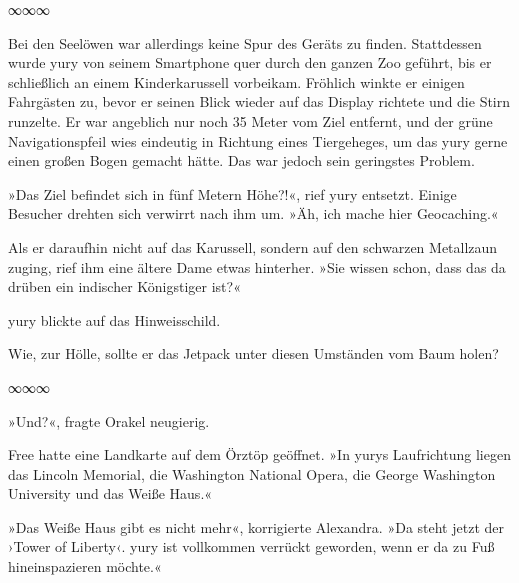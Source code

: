 \begin{center}
	∞∞∞
\end{center}

Bei den Seelöwen war allerdings keine Spur des Geräts zu finden. Stattdessen wurde yury von seinem Smartphone quer durch den ganzen Zoo geführt, bis er schließlich an einem Kinderkarussell vorbeikam. Fröhlich winkte er einigen Fahrgästen zu, bevor er seinen Blick wieder auf das Display richtete und die Stirn runzelte. Er war angeblich nur noch 35 Meter vom Ziel entfernt, und der grüne Navigationspfeil wies eindeutig in Richtung eines Tiergeheges, um das yury gerne einen großen Bogen gemacht hätte. Das war jedoch sein geringstes Problem.

»Das Ziel befindet sich in fünf Metern Höhe?!«, rief yury entsetzt. Einige Besucher drehten sich verwirrt nach ihm um. »Äh, ich mache hier Geocaching.«

Als er daraufhin nicht auf das Karussell, sondern auf den schwarzen Metallzaun zuging, rief ihm eine ältere Dame etwas hinterher. »Sie wissen schon, dass das da drüben ein indischer Königstiger ist?«

yury blickte auf das Hinweisschild.


Wie, zur Hölle, sollte er das Jetpack unter diesen Umständen vom Baum holen?

\begin{center}
	∞∞∞
\end{center}

»Und?«, fragte Orakel neugierig.

Free hatte eine Landkarte auf dem Örztöp geöffnet. »In yurys Laufrichtung liegen das Lincoln Memorial, die Washington National Opera, die George Washington University und das Weiße Haus.«

»Das Weiße Haus gibt es nicht mehr«, korrigierte Alexandra. »Da steht jetzt der ›Tower of Liberty‹. yury ist vollkommen verrückt geworden, wenn er da zu Fuß hineinspazieren möchte.«

